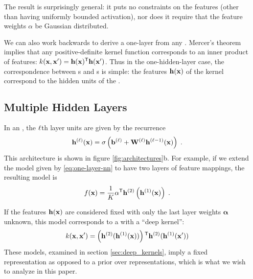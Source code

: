 The result is surprisingly general:
it puts no constraints on the features (other than having uniformly bounded activation), nor does it require that the feature weights $\alpha$ be Gaussian distributed.  

We can also work backwards to derive a one-layer \MLP{} from any \gp{}.
Mercer's theorem implies that any positive-definite kernel function corresponds to an inner product of features: $k({\bf{x}}, {\bf{x}}') = {\bf{h}}({\bf{x}}) {^\mathsf{T}} {\bf{h}}({\bf{x}}')$.
%
Thus in the one-hidden-layer case, the correspondence between \MLP{}s and \gp{}s is simple:
the features ${\bf{h}}({\bf{x}})$ of the kernel correspond to the hidden units of the \MLP{}.


\subsection{Multiple Hidden Layers}

In an \MLP{}, the $\ell$th layer units are given by the recurrence
%
\begin{align}
{\bf{h}}^{(\ell)}({\bf{x}}) = \sigma \left( {\bf{b}}^{(\ell)} + \mathbf{W}^{(\ell)} {\bf{h}}^{(\ell-1)}({\bf{x}}) \right) \;.
\label{eq:nextlayer}
\end{align}
This architecture is shown in figure \ref{fig:architectures}b. 
%
For example, if we extend the model given by \eqref{eq:one-layer-nn} to have two layers of feature mappings,  the resulting model is
%
\begin{align}
f({\bf{x}}) = \frac{1}{K}{\mathbf \alpha}{^\mathsf{T}} {\bf{h}}^{(2)}\left( {\bf{h}}^{(1)}({\bf{x}}) \right) \;.
\label{eq:mutli-layer-nn}
\end{align}

If the features ${\bf{h}}({\bf{x}})$ are considered fixed with only the last layer weights ${\mathbf \alpha}$ unknown, this model corresponds to a \gp{} with a ``deep kernel'': 
\begin{align}
k({\bf{x}}, {\bf{x}}') = \left( {\bf{h}}^{(2)} ( {\bf{h}}^{(1)}({\bf{x}}) ) \right) {^\mathsf{T}} {\bf{h}}^{(2)} ({\bf{h}}^{(1)}({\bf{x}}') )
\end{align}
These models, examined in section \ref{sec:deep_kernels}, imply a fixed representation as opposed to a prior over representations, which is what we wish to analyze in this paper.


